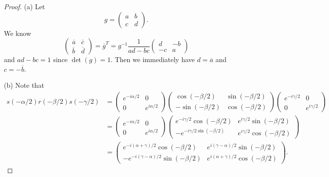 \documentclass{article}
\begin{document}
\begin{proof}
(a) Let
\[
g=
\left ( \begin{array}{cc} a & b\\ c & d \end{array} \right ).
\]
We know
\[
\left ( \begin{array}{cc} \overline{a} & \overline{c}\\ \overline{b} & \overline{d} \end{array} \right )
= \overline{g}^T
= g^{-1}
\frac{1}{ad-bc} \left ( \begin{array}{cc} d & -b\\ -c & a \end{array} \right )
\]
and $ad-bc = 1$ since $\det(g) = 1$. Then we immediately have $d = \overline{a}$ and $c = - \overline{b}$.

(b) Note that
\begin{align*}
s(-\alpha/2)r(-\beta/2)s(-\gamma/2)
&= \left (
\begin{array}{cc}
e^{-i\alpha/2} & 0\\
0 & e^{i\alpha/2}
\end{array}
\right )
\left (
\begin{array}{cc}
\cos (-\beta/2) & \sin (-\beta/2)\\
-\sin (-\beta/2) & \cos (-\beta/2)
\end{array}
\right )
\left (
\begin{array}{cc}
e^{-i\gamma/2} & 0\\
0 & e^{i\gamma/2}
\end{array}
\right )\\
&= \left (
\begin{array}{cc}
e^{-i\alpha/2} & 0\\
0 & e^{i\alpha/2}
\end{array}
\right )
\left (
\begin{array}{cc}
e^{-i\gamma/2} \cos(-\beta/2) & e^{i\gamma/2} \sin(-\beta/2)\\
-e^{-i\gamma/2 \sin(-\beta/2)} & e^{i\gamma/2} \cos(-\beta/2)
\end{array}
\right )\\
&= \left (
\begin{array}{cc}
e^{-i(\alpha + \gamma)/2} \cos(-\beta/2) & e^{i(\gamma - \alpha)/2} \sin(-\beta/2)\\
-e^{-i(\gamma - \alpha)/2} \sin(-\beta/2) & e^{i(\alpha + \gamma)/2} \cos(-\beta/2)
\end{array}
\right ).
\end{align*}

\end{proof}
\end{document}
